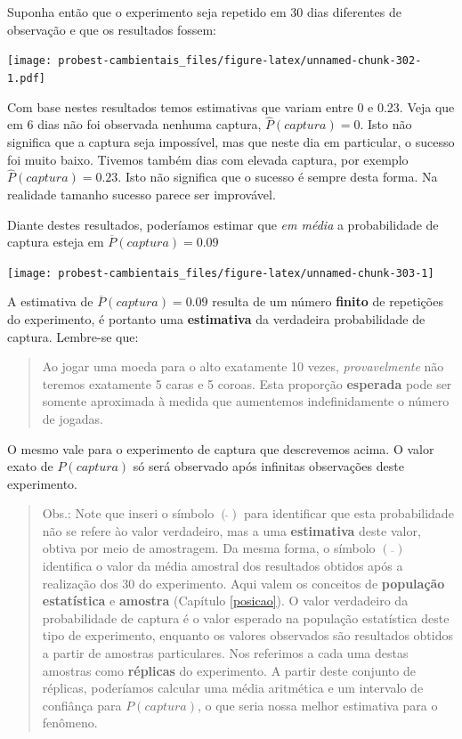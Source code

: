 \documentclass[
]{book}
\begin{document}
Suponha então que o experimento seja repetido em 30 dias diferentes de observação e que os resultados fossem:

\texttt{[image: probest-cambientais\_files/figure-latex/unnamed-chunk-302-1.pdf]}

Com base nestes resultados temos estimativas que variam entre 0 e 0.23. Veja que em 6 dias não foi observada nenhuma captura, \(\hat{P}(captura) = 0\). Isto não significa que a captura seja impossível, mas que neste dia em particular, o sucesso foi muito baixo. Tivemos também dias com elevada captura, por exemplo \(\hat{P}(captura) = 0.23\). Isto não significa que o sucesso é sempre desta forma. Na realidade tamanho sucesso parece ser improvável.

Diante destes resultados, poderíamos estimar que \emph{em média} a probabilidade de captura esteja em \(\overline{P}(captura) = 0.09\)

\begin{center}\texttt{[image: probest-cambientais\_files/figure-latex/unnamed-chunk-303-1]} \end{center}

A estimativa de \(\overline{P}(captura) = 0.09\) resulta de um número \textbf{finito} de repetições do experimento, é portanto uma \textbf{estimativa} da verdadeira probabilidade de captura. Lembre-se que:

\begin{quote}
Ao jogar uma moeda para o alto exatamente 10 vezes, \emph{provavelmente} não teremos exatamente 5 caras e 5 coroas. Esta proporção \textbf{esperada} pode ser somente aproximada à medida que aumentemos indefinidamente o número de jogadas.
\end{quote}

O mesmo vale para o experimento de captura que descrevemos acima. O valor exato de \(P(captura)\) só será observado após infinitas observações deste experimento.

\begin{quote}
Obs.: Note que inseri o símbolo \((\hat{})\) para identificar que esta probabilidade não se refere ào valor verdadeiro, mas a uma \textbf{estimativa} deste valor, obtiva por meio de amostragem. Da mesma forma, o símbolo \((\overline{})\) identifica o valor da média amostral dos resultados obtidos após a realização dos 30 do experimento. Aqui valem os conceitos de \textbf{população estatística} e \textbf{amostra} (Capítulo \ref{posicao}). O valor verdadeiro da probabilidade de captura é o valor esperado na população estatística deste tipo de experimento, enquanto os valores observados são resultados obtidos a partir de amostras particulares. Nos referimos a cada uma destas amostras como \textbf{réplicas} do experimento. A partir deste conjunto de réplicas, poderíamos calcular uma média aritmética e um intervalo de confiânça para \(P(captura)\), o que seria nossa melhor estimativa para o fenômeno.
\end{quote}
\end{document}
